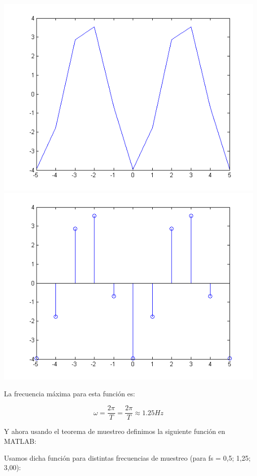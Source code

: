 \documentclass[a4paper,12pt]{article}
\begin{document}
\begin{enumerate}
\begin{center}
\includegraphics[width=.9 \textwidth]{../ejercicio-4-a-2.png}
\includegraphics[width=.9 \textwidth]{../ejercicio-4-a-1.png}
\end{center}

La frecuencia máxima para esta función es:

$$ \omega = \frac{2 \pi}{T} = \frac{2 \pi}{T} \approx 1.25 Hz$$

Y ahora usando el teorema de muestreo definimos la siguiente función en MATLAB:



Usamos dicha función para distintas frecuencias de muestreo (para fs = 0,5; 1,25; 3,00):




\end{enumerate}
\end{document}
